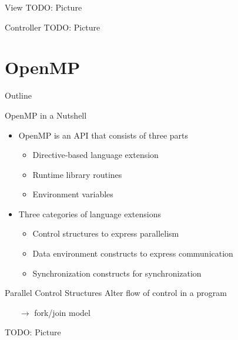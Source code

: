 \begin{frame}{View}
  TODO: Picture
\end{frame}

\begin{frame}{Controller}
  TODO: Picture
\end{frame}


\section{OpenMP}

\begin{frame}{Outline}
  \tableofcontents[current]
\end{frame}

\begin{frame}{OpenMP in a Nutshell}
  \begin{itemize}
  \item OpenMP is an API that consists of three parts
    \begin{itemize}
    \item Directive-based language extension
    \item Runtime library routines
    \item Environment variables
    \end{itemize}
  \item Three categories of language extensions
    \begin{itemize}
    \item Control structures to express \alert{parallelism}
    \item Data environment constructs to express \alert{communication}
    \item Synchronization constructs for \alert{synchronization}
    \end{itemize}
  \end{itemize}
\end{frame}

\begin{frame}{Parallel Control Structures}
  Alter flow of control in a program

  \begin{itemize}
  \item[$\rightarrow$] fork/join model
  \end{itemize}


  TODO: Picture
\end{frame}

